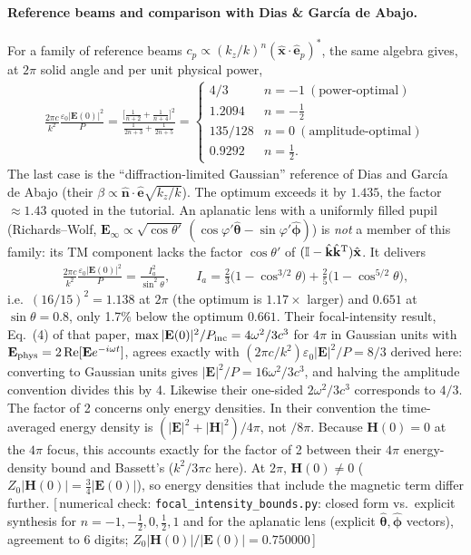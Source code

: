 \documentclass[11pt,letterpaper]{article}
\newcommand{\vect}[1]{\mathbf{#1}}
\newcommand{\Ev}{\vect{E}}
\newcommand{\Hv}{\vect{H}}
\newcommand{\kv}{\vect{k}}
\newcommand{\khat}{\hat{\kv}}
\newcommand{\xhat}{\hat{\vect{x}}}
\newcommand{\ep}{\hat{\vect{e}}_p}
\newcommand{\II}{\mathbb{I}}
\renewcommand{\Re}{\operatorname{Re}}
\newcommand{\code}[1]{\texttt{\small #1}}
\newcommand{\numcheck}[1]{\hfill{\small\color{green!40!black}[\,numerical check: #1\,]}}
\begin{document}
\paragraph{Reference beams and comparison with Dias \& Garc\'ia de Abajo.} For a family of reference beams $c_p\propto(k_z/k)^n(\xhat\cdot\ep)^*$, the same algebra gives, at $2\pi$ solid angle and per unit physical power,
\begin{align}
    \frac{2\pi c}{k^2}\frac{\varepsilon_0|\Ev(0)|^2}{P}=\frac{\big[\tfrac1{n+2}+\tfrac1{n+4}\big]^2}{\tfrac1{2n+3}+\tfrac1{2n+5}}
    =\begin{cases}4/3 & n=-1\ (\text{power-optimal})\\ 1.2094 & n=-\tfrac12\\ 135/128 & n=0\ (\text{amplitude-optimal})\\ 0.9292 & n=\tfrac12.\end{cases}
\end{align}
The last case is the ``diffraction-limited Gaussian'' reference of Dias and Garc\'ia de Abajo (their $\beta\propto\hat{\vect n}\cdot\hat{\vect e}\sqrt{k_z/k}$). The optimum exceeds it by $1.435$, the factor $\approx1.43$ quoted in the tutorial. An aplanatic lens with a uniformly filled pupil (Richards--Wolf, $\Ev_\infty\propto\sqrt{\cos\theta'}\,(\cos\varphi'\hat{\bm\theta}-\sin\varphi'\hat{\bm\phi})$) is \emph{not} a member of this family: its TM component lacks the factor $\cos\theta'$ of $(\II-\khat\khat^{\rm T})\xhat$. It delivers
\begin{align*}
    \frac{2\pi c}{k^2}\frac{\varepsilon_0|\Ev(0)|^2}{P}=\frac{I_a^2}{\sin^2\theta},\qquad I_a=\tfrac23\big(1-\cos^{3/2}\theta\big)+\tfrac25\big(1-\cos^{5/2}\theta\big),
\end{align*}
i.e.\ $(16/15)^2=1.138$ at $2\pi$ (the optimum is $1.17\times$ larger) and $0.651$ at $\sin\theta=0.8$, only 1.7\% below the optimum $0.661$. Their focal-intensity result, Eq.~(4) of that paper, $\max|\Ev(0)|^2/P_{\rm inc}=4\omega^2/3c^3$ for $4\pi$ in Gaussian units with $\Ev_{\rm phys}=2\Re[\Ev e^{-i\omega t}]$, agrees exactly with $(2\pi c/k^2)\varepsilon_0|\Ev|^2/P=8/3$ derived here: converting to Gaussian units gives $|\Ev|^2/P=16\omega^2/3c^3$, and halving the amplitude convention divides this by 4. Likewise their one-sided $2\omega^2/3c^3$ corresponds to $4/3$. The factor of 2 concerns only energy densities. In their convention the time-averaged energy density is $(|\Ev|^2+|\Hv|^2)/4\pi$, not $/8\pi$. Because $\Hv(0)=0$ at the $4\pi$ focus, this accounts exactly for the factor of 2 between their $4\pi$ energy-density bound and Bassett's ($k^2/3\pi c$ here). At $2\pi$, $\Hv(0)\neq0$ ($Z_0|\Hv(0)|=\tfrac34|\Ev(0)|$), so energy densities that include the magnetic term differ further.
\numcheck{\code{focal\_intensity\_bounds.py}: closed form vs.\ explicit synthesis for $n=-1,-\tfrac12,0,\tfrac12,1$ and for the aplanatic lens (explicit $\hat{\bm\theta},\hat{\bm\phi}$ vectors), agreement to 6 digits; $Z_0|\Hv(0)|/|\Ev(0)|=0.750000$}
\end{document}
